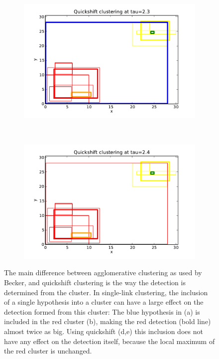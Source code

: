 \begin{figure}[hbt]
    \begin{subfigure}[b]{0.32\textwidth}
            \centering
            \includegraphics[width=\textwidth]{visQS23}
            \caption{}
            \label{fig:slvqs_sl1}
    \end{subfigure}
    ~
    \begin{subfigure}[b]{0.32\textwidth}
            \centering
            \includegraphics[width=\textwidth]{visQS24}
            \caption{}
            \label{fig:slvqs_sl2}
    \end{subfigure}
    \caption{The main difference between agglomerative clustering as used by Becker, and quickshift clustering is the way the detection is determined from the cluster. In single-link clustering, the inclusion of a single hypothesis into a cluster can have a large effect on the detection formed from this cluster: The blue hypothesis in (a) is included in the red cluster (b), making the red detection (bold line) almost twice as big. Using quickshift (d,e) this inclusion does not have any effect on the detection itself, because the local maximum of the red cluster is unchanged.}
    \label{fig:sl_vs_qs_clustering}
\end{figure}

